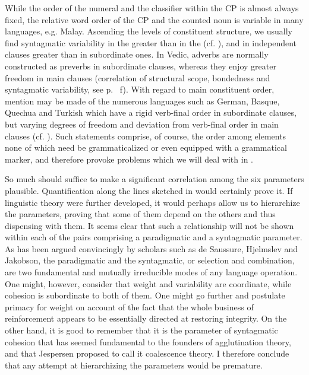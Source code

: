 \noindent While the order of the numeral and the classifier within the CP is almost always fixed, the relative word order of the CP and the counted noun is variable in many languages, e.g. Malay. Ascending the levels of constituent structure, we usually find syntagmatic variability in the \vp greater than in the \np (cf. \citealt[92f]{Givón1975}), and in independent clauses greater than in subordinate ones. In Vedic, adverbs are normally constructed as preverbs in subordinate clauses, whereas they enjoy greater freedom in main clauses (correlation of structural scope, bondedness and syntagmatic variability, see p.~\pageref{page106}\chk%
f). With regard to main constituent order, mention may be made of the numerous languages such as German, Basque, Quechua and Turkish which have a rigid verb-final order in subordinate clauses, but varying degrees of freedom and deviation from verb-final order in main clauses (cf. \citealt{Ross1973}). Such statements comprise, of course, the order among elements none of which need be grammaticalized or even equipped with a grammatical marker, and therefore provoke problems which we will deal with in .


 


So much should suffice to make a significant correlation among the six parameters plausible. Quantification along the lines sketched in  would certainly prove it. If linguistic theory were further developed, it would perhaps allow us to hierarchize the parameters, proving that some of them depend on the others and thus dispensing with them. It seems clear that such a relationship will not be shown within each of the pairs comprising a paradigmatic and a syntagmatic parameter. As has been argued convincingly by scholars such as de Saussure, Hjelmslev and Jakobson, the paradigmatic and the syntagmatic, or selection and combination, are two fundamental and mutually irreducible modes of any language operation. One might, however, consider that weight and variability are coordinate, while cohesion is subordinate to both of them. One might go further and postulate primacy for weight on account of the fact that the whole business of reinforcement appears to be essentially directed at restoring integrity. On the other hand, it is good to remember that it is the parameter of syntagmatic cohesion that has seemed fundamental to the founders of agglutination theory, and that Jespersen proposed to call it coalescence theory. I therefore conclude that any attempt at hierarchizing the parameters would be premature.

